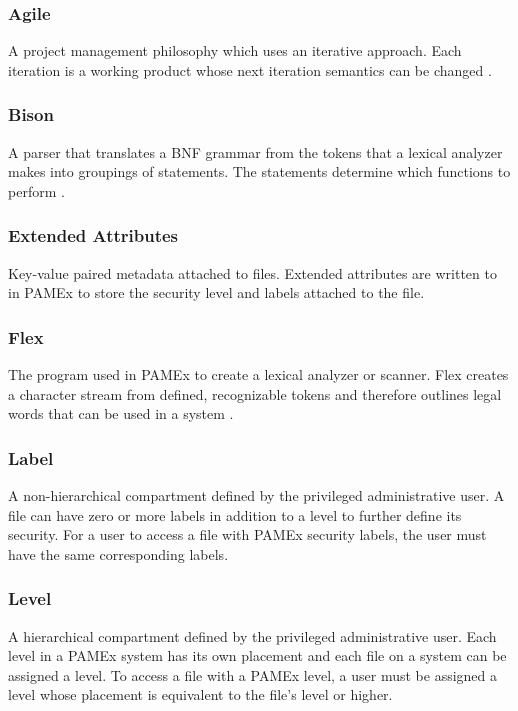 \subsubsection*{Agile}

A project management philosophy which uses an iterative approach. Each iteration is a working product whose next iteration semantics can be changed \cite{kung2014}.

\subsubsection*{Bison}

A parser that translates a BNF grammar from the tokens that a lexical analyzer makes into groupings of statements. The statements determine which functions to perform \cite{levine2009}.

\subsubsection*{Extended Attributes}

Key-value paired metadata attached to files. Extended attributes are written to in PAMEx to store the security level and labels attached to the file. 

\subsubsection*{Flex}

The program used in PAMEx to create a lexical analyzer or scanner. Flex creates a character stream from defined, recognizable tokens and therefore outlines legal words that can be used in a system \cite{levine2009}.

\subsubsection*{Label}

A non-hierarchical compartment defined by the privileged administrative user. A file can have zero or more labels in addition to a level to further define its security. For a user to access a file with PAMEx security labels, the user must have the same corresponding labels. 

\subsubsection*{Level}

A hierarchical compartment defined by the privileged administrative user. Each level in a PAMEx system has its own placement and each file on a system can be assigned a level. To access a file with a PAMEx level, a user must be assigned a level whose placement is equivalent to the file’s level or higher.

